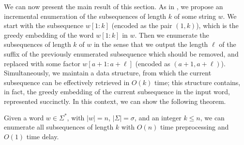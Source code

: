 \documentclass[runningheads,UKenglish,cleveref, autoref, thm-restate]{llncs}
\begin{document}
We can now present the main result of this section. As in \cite{AdamsonGM24}, we propose an incremental enumeration of the subsequences of length $k$ of some string $w$. We start with the subsequence $w[1:k]$ (encoded as the pair $(1,k)$), which is the greedy embedding of the word $w[1:k]$ in $w$. Then we enumerate the subsequences of length $k$ of $w$ in the sense that we output the length $\ell$ of the suffix of the previously enumerated subsequence which should be removed, and replaced with some factor $w[a+1:a+\ell]$ (encoded as $(a+1,a+\ell)$). Simultaneously, we maintain a data structure, from which the current subsequence can be effectively retrieved in $O(k)$ time; this structure contains, in fact, the greedy embedding of the current subsequence in the input word, represented succinctly. In this context, we can show the following theorem.
\begin{theorem}
Given a word $w \in \Sigma^*$, with $|w|=n$, $|\Sigma|=\sigma$, and an integer $k \leq n$, we can enumerate all subsequences of length $k$ with $O(n )$ time preprocessing and $O(1)$ time delay.
\end{theorem}
\end{document}
